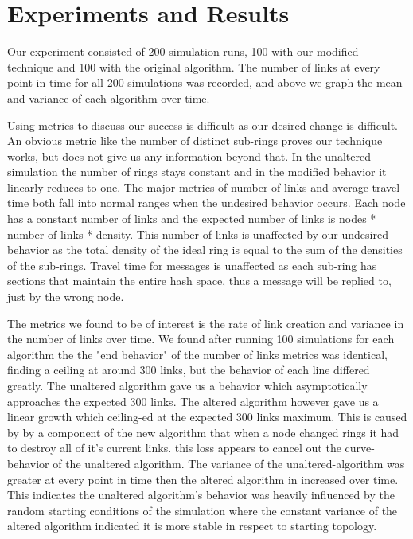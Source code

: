 \documentclass[12pt]{article} %
\begin{document}
\section{Experiments and Results}
Our experiment consisted of 200 simulation runs, 100 with our modified technique and 100 with the original algorithm. The number of links at every point in time for all 200 simulations was recorded, and above we graph the mean and variance of each algorithm over time.

Using metrics to discuss our success is difficult as our desired change is difficult. An obvious metric like the number of distinct sub-rings proves our technique works, but does not give us any information beyond that. In the unaltered simulation the number of rings stays constant and in the modified behavior it linearly reduces to one. The major metrics of number of links and average travel time both fall into normal ranges when the undesired behavior occurs. Each node has a constant number of links and the expected number of links is nodes * number of links * density. This number of links is unaffected by our undesired behavior as the total density of the ideal ring is equal to the sum of the densities of the sub-rings. Travel time for messages is unaffected as each sub-ring has sections that maintain the entire hash space, thus a message will be replied to, just by the wrong node.

The metrics we found to be of interest is the rate of link creation and variance in the number of links over time. We found after running 100 simulations for each algorithm the the "end behavior" of the number of links metrics was identical, finding a ceiling at around 300 links, but the behavior of each line differed greatly. The unaltered algorithm gave us a behavior which asymptotically approaches the expected 300 links. The altered algorithm however gave us a linear growth which ceiling-ed at the expected 300 links maximum. This is caused by by a component of the new algorithm that when a node changed rings it had to destroy all of it's current links. this loss appears to cancel out the curve-behavior of the unaltered algorithm. The variance of the unaltered-algorithm was greater at every point in time then the altered algorithm in increased over time. This indicates the unaltered algorithm's behavior was heavily influenced by the random starting conditions of the simulation where the constant variance of the altered algorithm indicated it is more stable in respect to starting topology. 
\end{document}
